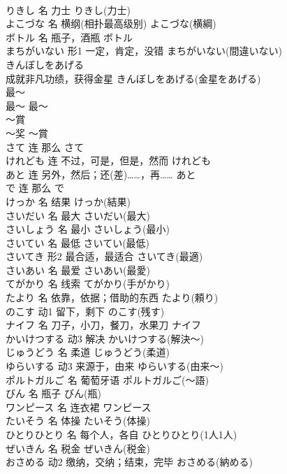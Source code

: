 \documentclass[8pt]{extreport}
\begin{document}
\begin{CJK}{UTF8}{min}
\\	りきし	名	力士	りきし(力士)	
\\	よこづな	名	横纲(相扑最高级别)	よこづな(横綱)	
\\	ボトル	名	瓶子，酒瓶	ボトル	
\\	まちがいない	形1	一定，肯定，没错	まちがいない(間違いない)	
\\	きんぼしをあげる	
\\	成就非凡功绩，获得金星	きんぼしをあげる(金星をあげる)	
\\	最～	
\\	最～	最～	
\\	～賞	
\\	～奖	～賞	
\\	さて	连	那么	さて	
\\	けれども	连	不过，可是，但是，然而	けれども	
\\	あと	连	另外，然后；还(差)……，再……	あと	
\\	で	连	那么	で	
\\	けっか	名	结果	けっか(結果)	
\\	さいだい	名	最大	さいだい(最大)	
\\	さいしょう	名	最小	さいしょう(最小)	
\\	さいてい	名	最低	さいてい(最低)	
\\	さいてき	形2	最合适，最适合	さいてき(最適)	
\\	さいあい	名	最爱	さいあい(最愛)	
\\	てがかり	名	线索	てがかり(手がかり)	
\\	たより	名	依靠，依据；借助的东西	たより(頼り)	
\\	のこす	动1	留下，剩下	のこす(残す)	
\\	ナイフ	名	刀子，小刀，餐刀，水果刀	ナイフ	
\\	かいけつする	动3	解决	かいけつする(解決～)	
\\	じゅうどう	名	柔道	じゅうどう(柔道)	
\\	ゆらいする	动3	来源于，由来	ゆらいする(由来～)	
\\	ポルトガルご	名	葡萄牙语	ポルトガルご(～語)	
\\	びん	名	瓶子	びん(瓶)	
\\	ワンピース	名	连衣裙	ワンピース	
\\	たいそう	名	体操	たいそう(体操)	
\\	ひとりひとり	名	每个人，各自	ひとりひとり(1人1人)	
\\	ぜいきん	名	税金	ぜいきん(税金)	
\\	おさめる	动2	缴纳，交纳；结束，完毕	おさめる(納める)	

\end{CJK}
\end{document}
